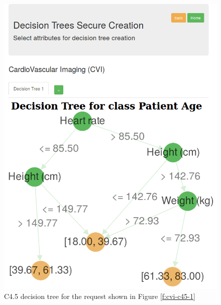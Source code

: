 \begin{minipage}{0.47\textwidth}
  \begin{figure}[H]
  \includegraphics[width=\columnwidth]{figures/cvi_c45_2.png}
  \caption{C4.5 decision tree for the request shown in Figure \ref{f:cvi-c45-1}}
  \label{f:cvi-c45-2}
\end{figure}
\end{minipage}
